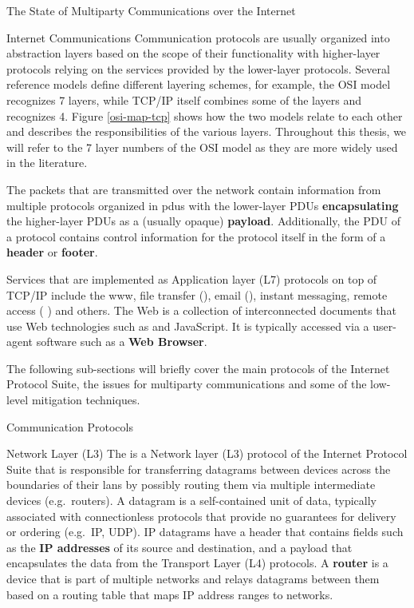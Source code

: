 \begin{frame}[fragile]{The State of Multiparty Communications over the
Internet}
\begin{block}{Internet Communications}
Communication protocols are usually organized into abstraction layers
based on the scope of their functionality with higher-layer protocols
relying on the services provided by the lower-layer protocols. Several
reference models define different layering schemes, for example, the OSI
model recognizes 7 layers, while TCP/IP itself combines some of the
layers and recognizes 4. Figure \ref{osi-map-tcp} shows how the two
models relate to each other and describes the responsibilities of the
various layers. Throughout this thesis, we will refer to the 7 layer
numbers of the OSI model as they are more widely used in the literature.

The packets that are transmitted over the network contain information
from multiple protocols organized in \glspl{pdu} with the lower-layer
PDUs \textbf{encapsulating} the higher-layer PDUs as a (usually opaque)
\textbf{payload}. Additionally, the PDU of a protocol contains control
information for the protocol itself in the form of a \textbf{header} or
\textbf{footer}.

Services that are implemented as Application layer (L7) protocols on top
of TCP/IP include the \gls{www}, file transfer (), email
(), instant messaging, remote access (
\autocite{sshRFC}) and others. The Web is a collection of interconnected
documents that use Web technologies such as  and JavaScript. It
is typically accessed via a user-agent software such as a \textbf{Web
Browser}.

The following sub-sections will briefly cover the main protocols of the
Internet Protocol Suite, the issues for multiparty communications and
some of the low-level mitigation techniques.


\begin{block}{Communication Protocols}
\protect\hypertarget{communication-protocols}{}
\begin{block}{Network Layer (L3)}
\protect\hypertarget{network-layer-l3}{}
The  \autocite{ipv4RFC} is a Network layer (L3) protocol of the
Internet Protocol Suite that is responsible for transferring datagrams
between devices across the boundaries of their \glspl{lan} by possibly
routing them via multiple intermediate devices (e.g.~routers). A
datagram is a self-contained unit of data, typically associated with
connectionless protocols that provide no guarantees for delivery or
ordering (e.g.~IP, UDP).
 IP datagrams
have a header that contains fields such as the \textbf{IP addresses} of
its source and destination, and a
payload that encapsulates the data from the Transport Layer (L4)
protocols. A \textbf{router} is a device that is part of multiple
networks and relays datagrams between them based on a routing table that
maps IP address ranges to networks.
\end{block}


\end{block}
\end{block}
\end{frame}
